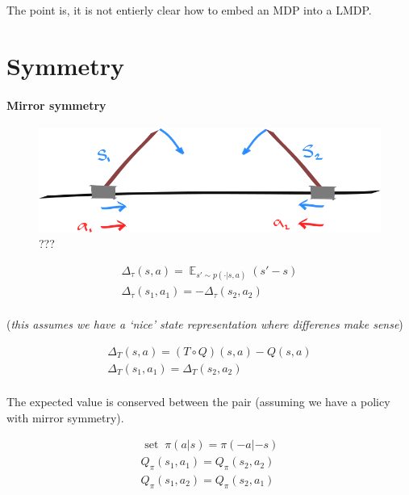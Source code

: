The point is, it is not entierly clear how to embed an MDP into a LMDP.


\section{Symmetry}


\hypertarget{mirror-symmetry}{%
\paragraph{Mirror symmetry}\label{mirror-symmetry}}

\begin{figure}
\centering
\includegraphics[width=1\textwidth,height=0.25\textheight]{../../pictures/drawings/cart-pole-mirror.png}
\caption{???}
\end{figure}

\begin{align}
\Delta_{\tau}(s, a) = \mathop{\mathbb E}_{s' \sim p(\cdot| s, a)} (s' - s) \\
\Delta_{\tau}(s_1, a_1) = - \Delta_{\tau}(s_2, a_2) \\
\end{align}

(\emph{this assumes we have a `nice' state representation where
differenes make sense})

\begin{align}
\Delta_{T}(s, a) = (T \circ Q)(s,a) - Q(s,a)\\
\Delta_{T}(s_1, a_1) = \Delta_{T}(s_2, a_2) \\
\end{align}

The expected value is conserved between the pair (assuming we have a
policy with mirror symmetry).

\begin{align}
\text{ set}\;\;\pi(a | s) = \pi(-a| -s) \\
Q_\pi(s_1, a_1) = Q_\pi(s_2, a_2) \\
Q_\pi(s_1, a_2) = Q_\pi(s_2, a_1) \\
\end{align}

